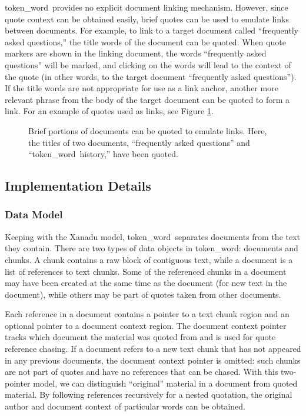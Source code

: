 \documentclass{acm_proc_article-sp}
\newcommand{\tw}{token\_word}
\begin{document}
\tw \  provides no explicit document linking mechanism.
However, since quote context can be obtained easily, brief quotes can be used to emulate links between documents.
For example, to link to a target document called ``frequently asked questions,'' the title words of the document can be quoted.
When quote markers are shown in the linking document, the words ``frequently asked questions'' will be marked, and clicking on the words will lead to the context of the quote (in other words, to the target document ``frequently asked questions'').
If the title words are not appropriate for use as a link anchor, another more relevant phrase from the body of the target document can be quoted to form a link.
For an example of quotes used as links, see Figure \ref{fig:quotesAsLinks}.

\begin{figure}[t]
\centering
{}
\caption{Brief portions of documents can be quoted to emulate links.  Here, the titles of two documents, ``frequently asked questions'' and ``\tw \  history,'' have been quoted.}
\label{fig:quotesAsLinks}
\end{figure}

\subsection{Implementation Details}

\subsubsection{Data Model}
Keeping with the Xanadu model, \tw \  separates documents from the text they contain.
There are two types of data objects in \tw:  documents and chunks.
A chunk contains a raw block of contiguous text, while a document is a list of references to text chunks.
Some of the referenced chunks in a document may have been created at the same time as the document (for new text in the document), while others may be part of quotes taken from other documents.

Each reference in a document contains a pointer to a text chunk region and an optional pointer to a document context region.
The document context pointer tracks which document the material was quoted from and is used for quote reference chasing.
If a document refers to a new text chunk that has not appeared in any previous documents, the document context pointer is omitted:  such chunks are not part of quotes and have no references that can be chased.
With this two-pointer model, we can distinguish ``original'' material in a document from quoted material.  %
By following references recursively for a nested quotation, the original author and document context of particular words can be obtained.
\end{document}
